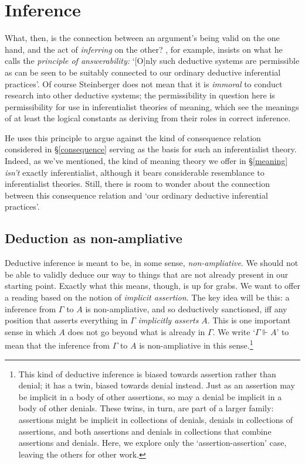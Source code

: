 \documentclass{article}
\newcommand{\G}{\ensuremath{\Gamma}}
\newcommand{\ded}{\Vdash}
\begin{document}
\section{Inference}

What, then, is the connection between an argument's being valid on the one hand, and the act of {\em inferring} on the other?
\cite{steinberger:wcsrs}, for example, insists on what he calls the {\em principle of answerability:} `[O]nly such deductive systems are permissible as can be seen to be suitably connected to our ordinary deductive inferential practices'.
Of course Steinberger does not mean that it is {\em immoral} to conduct research into other deductive systems; the permissibility in question here is permissibility for use in inferentialist theories of meaning, which see the meanings of at least the logical constants as deriving from their roles in correct inference.

He uses this principle to argue against the kind of consequence relation considered in \S\ref{consequence} serving as the basis for such an inferentialist theory.
Indeed, as we've mentioned, the kind of meaning theory we offer in \S\ref{meaning} {\em isn't} exactly inferentialist, although it bears considerable resemblance to inferentialist theories.
Still, there is room to wonder about the connection between this consequence relation and `our ordinary deductive inferential practices'.

\subsection{Deduction as non-ampliative}

Deductive inference is meant to be, in some sense, {\em non-ampliative}.
We should not be able to validly deduce our way to things that are not already present in our starting point.
Exactly what this means, though, is up for grabs.
We want to offer a reading based on the notion of {\em implicit assertion}.
The key idea will be this: a inference from $\G$ to $A$ is non-ampliative, and so deductively sanctioned, iff any position that asserts everything in $\G$ {\em implicitly asserts} $A$.
This is one important sense in which $A$ does not go beyond what is already in $\G$.
We write `$\G \ded A$' to mean that the inference from $\G$ to $A$ is non-ampliative in this sense.\footnote{This kind of deductive inference is biased towards assertion rather than denial; it has a twin, biased towards denial instead. 
Just as an assertion may be implicit in a body of other assertions, so may a denial be implicit in a body of other denials. 
These twins, in turn, are part of a larger family: assertions might be implicit in collections of denials, denials in collections of assertions, and both assertions and denials in collections that combine assertions and denials.
Here, we explore only the `assertion-assertion' case, leaving the others for other work.}
\end{document}
